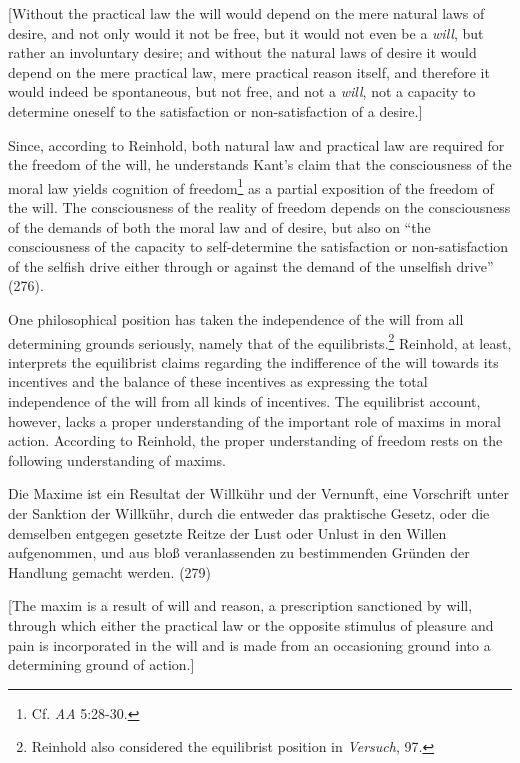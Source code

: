 [Without the practical law the will would depend on the mere natural laws of desire, and not only would it not be free, but it would not even be a \textit{will}, but rather an involuntary desire; and without the natural laws of desire it would depend on the mere practical law, mere practical reason itself, and therefore it would indeed be spontaneous, but not free, and not a \textit{will}, not a capacity to determine oneself to the satisfaction or non{-}satisfaction of a desire.]

Since, according to Reinhold, both natural law and practical law are required for the freedom of the will, he understands Kant's claim that the consciousness of the moral law yields cognition of freedom\footnote{ Cf. \textit{AA} 5:28{-}30.} as a partial exposition of the freedom of the will. The consciousness of the reality of freedom depends on the consciousness of the demands of both the moral law and of desire, but also on ``the consciousness of the capacity to self{-}determine the satisfaction or non{-}satisfaction of the selfish drive either through or against the demand of the unselfish drive'' (276). 

 One philosophical position has taken the independence of the will from all determining grounds seriously, namely that of the equilibrists.\footnote{ Reinhold also considered the equilibrist position in \textit{Versuch}, 97. } Reinhold, at least, interprets the equilibrist claims regarding the indifference of the will towards its incentives and the balance of these incentives as expressing the total independence of the will from all kinds of incentives. The equilibrist account, however, lacks a proper understanding of the important role of maxims in moral action. According to Reinhold, the proper understanding of freedom rests on the following understanding of maxims.

Die Maxime ist ein Resultat der Willk\"{u}hr und der Vernunft, eine Vorschrift unter der Sanktion der Willk\"{u}hr, durch die entweder das praktische Gesetz, oder die demselben entgegen gesetzte Reitze der Lust oder Unlust in den Willen aufgenommen, und aus blo\ss{} veranlassenden zu bestimmenden Gr\"{u}nden der Handlung gemacht werden. (279)

[The maxim is a result of will and reason, a prescription sanctioned by will, through which either the practical law or the opposite stimulus of pleasure and pain is incorporated in the will and is made from an occasioning ground into a determining ground of action.]

